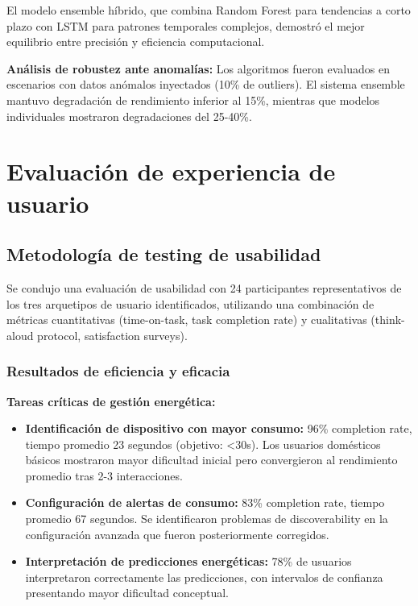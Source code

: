 El modelo ensemble híbrido, que combina Random Forest para tendencias a corto plazo con LSTM para patrones temporales complejos, demostró el mejor equilibrio entre precisión y eficiencia computacional.

\textbf{Análisis de robustez ante anomalías:}
Los algoritmos fueron evaluados en escenarios con datos anómalos inyectados (10\% de outliers). El sistema ensemble mantuvo degradación de rendimiento inferior al 15\%, mientras que modelos individuales mostraron degradaciones del 25-40\%.

\section{Evaluación de experiencia de usuario}

\subsection{Metodología de testing de usabilidad}

Se condujo una evaluación de usabilidad con 24 participantes representativos de los tres arquetipos de usuario identificados, utilizando una combinación de métricas cuantitativas (time-on-task, task completion rate) y cualitativas (think-aloud protocol, satisfaction surveys).

\subsubsection{Resultados de eficiencia y eficacia}

\textbf{Tareas críticas de gestión energética:}

\begin{itemize}
    \item \textbf{Identificación de dispositivo con mayor consumo:} 96\% completion rate, tiempo promedio 23 segundos (objetivo: <30s). Los usuarios domésticos básicos mostraron mayor dificultad inicial pero convergieron al rendimiento promedio tras 2-3 interacciones.
    
    \item \textbf{Configuración de alertas de consumo:} 83\% completion rate, tiempo promedio 67 segundos. Se identificaron problemas de discoverability en la configuración avanzada que fueron posteriormente corregidos.
    
    \item \textbf{Interpretación de predicciones energéticas:} 78\% de usuarios interpretaron correctamente las predicciones, con intervalos de confianza presentando mayor dificultad conceptual.
\end{itemize}

